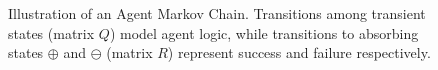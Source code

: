 \begin{figure}[!t]
  \caption{Illustration of an Agent Markov Chain. Transitions among transient
           states (matrix $Q$) model agent logic, while transitions to absorbing
           states $\oplus$ and $\ominus$ (matrix $R$) represent success and
           failure respectively.}
  \label{fig:markov_chain}
\end{figure}

